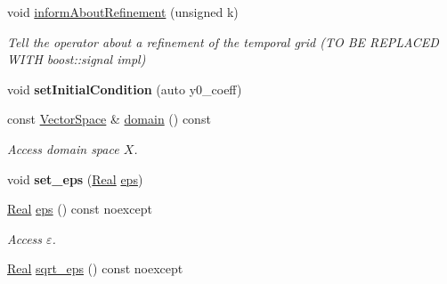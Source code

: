 \begin{DoxyCompactItemize}
void \hyperlink{classSpacy_1_1KaskadeParabolic_1_1C2Functional_af8b910a58475a708c88447b08c37b255}{inform\-About\-Refinement} (unsigned k)
\begin{DoxyCompactList}\small\item\em Tell the operator about a refinement of the temporal grid (T\-O B\-E R\-E\-P\-L\-A\-C\-E\-D W\-I\-T\-H boost\-::signal impl) \end{DoxyCompactList}\item 
\hypertarget{classSpacy_1_1KaskadeParabolic_1_1C2Functional_ac65943ce19e14157fd2b92fa9dd0040b}{void {\bfseries set\-Initial\-Condition} (auto y0\-\_\-coeff)}\label{classSpacy_1_1KaskadeParabolic_1_1C2Functional_ac65943ce19e14157fd2b92fa9dd0040b}

\item 
\hypertarget{classSpacy_1_1FunctionalBase_a2d3397deb9fa1ad85ed04e37a03b3aa6}{const \hyperlink{classSpacy_1_1VectorSpace}{Vector\-Space} \& \hyperlink{classSpacy_1_1FunctionalBase_a2d3397deb9fa1ad85ed04e37a03b3aa6}{domain} () const }\label{classSpacy_1_1FunctionalBase_a2d3397deb9fa1ad85ed04e37a03b3aa6}

\begin{DoxyCompactList}\small\item\em Access domain space $X$. \end{DoxyCompactList}\item 
\hypertarget{classSpacy_1_1Mixin_1_1Eps_a818ab6dfab5e4eea583e1302bcc621f8}{void {\bfseries set\-\_\-eps} (\hyperlink{classSpacy_1_1Real}{Real} \hyperlink{classSpacy_1_1Mixin_1_1Eps_a812b99b0abc1d78a34b4114907f23f52}{eps})}\label{classSpacy_1_1Mixin_1_1Eps_a818ab6dfab5e4eea583e1302bcc621f8}

\item 
\hypertarget{classSpacy_1_1Mixin_1_1Eps_a812b99b0abc1d78a34b4114907f23f52}{\hyperlink{classSpacy_1_1Real}{Real} \hyperlink{classSpacy_1_1Mixin_1_1Eps_a812b99b0abc1d78a34b4114907f23f52}{eps} () const noexcept}\label{classSpacy_1_1Mixin_1_1Eps_a812b99b0abc1d78a34b4114907f23f52}

\begin{DoxyCompactList}\small\item\em Access $\varepsilon$. \end{DoxyCompactList}\item 
\hypertarget{classSpacy_1_1Mixin_1_1Eps_a1c1b0ed7f14ed4967dc7da9295a136d4}{\hyperlink{classSpacy_1_1Real}{Real} \hyperlink{classSpacy_1_1Mixin_1_1Eps_a1c1b0ed7f14ed4967dc7da9295a136d4}{sqrt\-\_\-eps} () const noexcept}\label{classSpacy_1_1Mixin_1_1Eps_a1c1b0ed7f14ed4967dc7da9295a136d4}


\end{DoxyCompactItemize}
